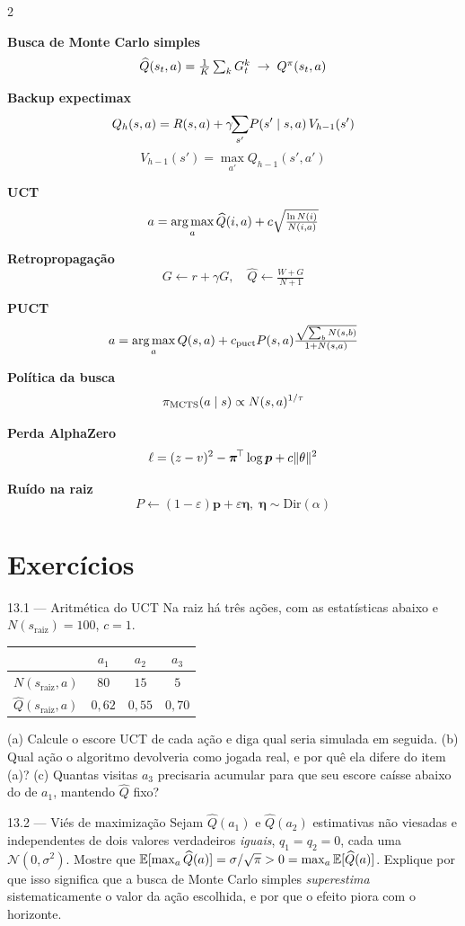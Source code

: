 \documentclass[a4paper, 11pt]{article}
\newcommand{\Nv}[1]{N(#1)}
\newcommand{\Qh}{\widehat{Q}}
\newcommand{\ret}{G}
\newcommand{\raiz}{s_{\mathrm{raiz}}}
\begin{document}
\begin{multicols}{2}
{\small
\textbf{Busca de Monte Carlo simples}
\[ \Qh(s_t,a)=\tfrac1K\textstyle\sum_k \ret^k_t \;\to\; \Qpi(s_t,a) \]

\textbf{Backup expectimax}
\[ Q_h(s,a)=R(s,a)+\gamma\!\!\sum_{s'}\!P(s'\mid s,a)\,V_{h-1}(s') \]
\[ V_{h-1}(s')=\max_{a'}Q_{h-1}(s',a') \]

\textbf{UCT}
\[ a=\argmax_a \Qh(i,a)+c\sqrt{\tfrac{\ln \Nv{i}}{\Nv{i,a}}} \]

\textbf{Retropropagação}
\[ \ret \gets r+\gamma\ret, \quad \Qh \gets \tfrac{W+\ret}{N+1} \]

\columnbreak

\textbf{PUCT}
\[ a=\argmax_a Q(s,a)+c_{\text{puct}}P(s,a)\tfrac{\sqrt{\sum_b \Nv{s,b}}}{1+\Nv{s,a}} \]

\textbf{Política da busca}
\[ \pol_{\text{MCTS}}(a\mid s)\propto \Nv{s,a}^{1/\tau} \]

\textbf{Perda AlphaZero}
\[ \ell=(z-v)^2-\bm{\pi}^{\!\top}\log\bm{p}+c\lVert\theta\rVert^2 \]

\textbf{Ruído na raiz}
\[ P\gets(1-\varepsilon)\bm{p}+\varepsilon\bm{\eta},\; \bm{\eta}\sim\mathrm{Dir}(\alpha) \]}
\end{multicols}

\section{Exercícios}

\begin{exbox}{13.1 --- Aritmética do UCT}
Na raiz há três ações, com as estatísticas abaixo e $\Nv{\raiz}=100$, $c=1$.
\begin{center}
{\small\begin{tabular}{@{}lccc@{}}
\toprule
 & $a_1$ & $a_2$ & $a_3$ \\
\midrule
$\Nv{\raiz,a}$ & $80$ & $15$ & $5$ \\
$\Qh(\raiz,a)$ & $0{,}62$ & $0{,}55$ & $0{,}70$ \\
\bottomrule
\end{tabular}}
\end{center}
(a) Calcule o escore UCT de cada ação e diga qual seria simulada em seguida.
(b) Qual ação o algoritmo devolveria como jogada real, e por quê ela difere do
item (a)? (c) Quantas visitas $a_3$ precisaria acumular para que seu escore
caísse abaixo do de $a_1$, mantendo $\Qh$ fixo?
\end{exbox}

\begin{exbox}{13.2 --- Viés de maximização}
Sejam $\Qh(a_1)$ e $\Qh(a_2)$ estimativas não viesadas e independentes de dois
valores verdadeiros \emph{iguais}, $q_1=q_2=0$, cada uma $\mathcal{N}(0,\sigma^2)$.
Mostre que $\E[\max_a \Qh(a)] = \sigma/\sqrt{\pi} > 0 = \max_a \E[\Qh(a)]$.
Explique por que isso significa que a busca de Monte Carlo simples
\emph{superestima} sistematicamente o valor da ação escolhida, e por que o
efeito piora com o horizonte.
\end{exbox}
\end{document}
